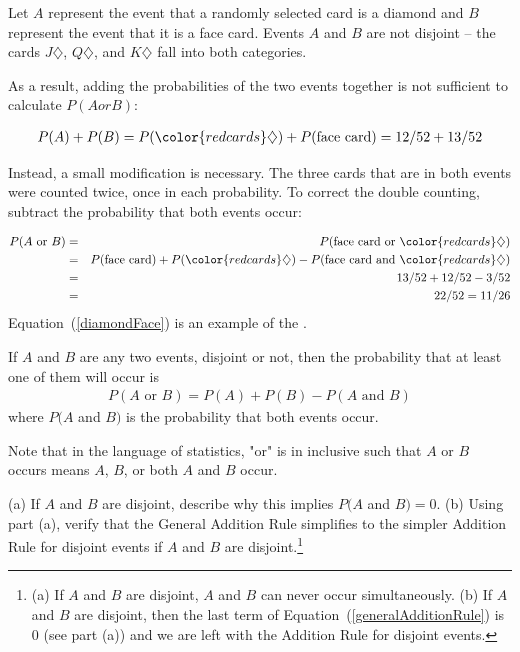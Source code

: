 \begin{doublespace}
Let $A$ represent the event that a randomly selected card is a diamond and $B$ represent the event that it is a face card. Events $A$ and $B$ are not disjoint -- the cards {\color{redcards}$J\diamondsuit$}, {\color{redcards}$Q\diamondsuit$}, and {\color{redcards}$K\diamondsuit$} fall into both categories. 

As a result, adding the probabilities of the two events together is not sufficient to calculate $P(A or B)$:

\begin{eqnarray*}
	P(A) + P(B) = P({\color{redcards}\diamondsuit}) + P(\text{face card}) = 12/52 + 13/52
	\label{overCountFaceDiamond}
\end{eqnarray*}

Instead, a small modification is necessary. The three cards that are in both events were counted twice, once in each probability. To correct the double counting, subtract the probability that both events occur:

\begin{eqnarray}
P(A\text{ or } B) &=&P(\text{face card or }{\color{redcards}\diamondsuit})  \notag \\
 &=& P(\text{face card}) + P({\color{redcards}\diamondsuit}) - P(\text{face card and }{\color{redcards}\diamondsuit}) \label{diamondFace} \\
 &=& 13/52 + 12/52 - 3/52 \notag \\
 &=& 22/52 = 11/26 \notag
\end{eqnarray}
Equation~(\ref{diamondFace}) is an example of the . 

\begin{termBox}{ If $A$ and $B$ are any two events, disjoint or not, then the probability that at least one of them will occur is
\begin{eqnarray}
P(A\text{ or }B) = P(A) + P(B) - P(A\text{ and }B)
\label{generalAdditionRule}
\end{eqnarray}
where $P(A$ and $B)$ is the probability that both events occur.}
\end{termBox}


\begin{tipBox}{
Note that in the language of statistics, "or" is in inclusive such that $A$ or $B$ occurs means $A$, $B$, or both $A$ and $B$ occur.}
\end{tipBox}

\begin{exercise}
(a) If $A$ and $B$ are disjoint, describe why this implies $P(A$ and $B) = 0$. (b) Using part (a), verify that the General Addition Rule simplifies to the simpler Addition Rule for disjoint events if $A$ and $B$ are disjoint.\footnote{(a) If $A$ and $B$ are disjoint, $A$ and $B$ can never occur simultaneously. (b) If $A$ and $B$ are disjoint, then the last term of Equation~(\ref{generalAdditionRule}) is 0 (see part (a)) and we are left with the Addition Rule for disjoint events.}
\end{exercise}


\end{doublespace}
